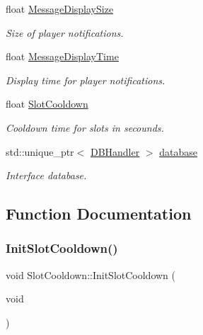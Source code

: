 \begin{DoxyCompactItemize}
float \mbox{\hyperlink{namespace_slot_cooldown_a45d147dcd56cfa641b7dc9f9303db683}{Message\+Display\+Size}}
\begin{DoxyCompactList}\small\item\em Size of player notifications. \end{DoxyCompactList}\item 
float \mbox{\hyperlink{namespace_slot_cooldown_a9c1b0776e8b6e909e5a94f465c7669e1}{Message\+Display\+Time}}
\begin{DoxyCompactList}\small\item\em Display time for player notifications. \end{DoxyCompactList}\item 
float \mbox{\hyperlink{namespace_slot_cooldown_a1684ab6db297facc86efbca540cd19f9}{Slot\+Cooldown}}
\begin{DoxyCompactList}\small\item\em Cooldown time for slots in secounds. \end{DoxyCompactList}\item 
std\+::unique\+\_\+ptr$<$ \mbox{\hyperlink{class_d_b_handler}{D\+B\+Handler}} $>$ \mbox{\hyperlink{namespace_slot_cooldown_a0945ac0ffac4f4655877d61f50837c70}{database}}
\begin{DoxyCompactList}\small\item\em Interface database. \end{DoxyCompactList}\end{DoxyCompactItemize}


\subsection{Function Documentation}
\mbox{\label{namespace_slot_cooldown_af1d102851d318b69e6b808f8c1b0f6fa}} 
\subsubsection{\texorpdfstring{Init\+Slot\+Cooldown()}{InitSlotCooldown()}}
{\footnotesize\ttfamily void Slot\+Cooldown\+::\+Init\+Slot\+Cooldown (\begin{DoxyParamCaption}\item[{void}]{ }\end{DoxyParamCaption})}



